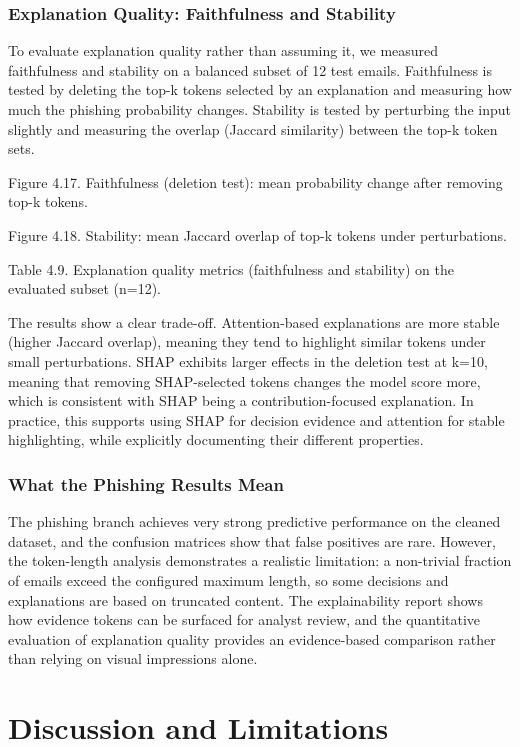 \documentclass[conference]{IEEEtran}
\begin{document}
\subsubsection{Explanation Quality: Faithfulness and Stability}

To evaluate explanation quality rather than assuming it, we measured faithfulness and stability on a balanced subset of 12 test emails. Faithfulness is tested by deleting the top-k tokens selected by an explanation and measuring how much the phishing probability changes. Stability is tested by perturbing the input slightly and measuring the overlap (Jaccard similarity) between the top-k token sets.

Figure 4.17. Faithfulness (deletion test): mean probability change after removing top-k tokens.

Figure 4.18. Stability: mean Jaccard overlap of top-k tokens under perturbations.

Table 4.9. Explanation quality metrics (faithfulness and stability) on the evaluated subset (n=12).

The results show a clear trade-off. Attention-based explanations are more stable (higher Jaccard overlap), meaning they tend to highlight similar tokens under small perturbations. SHAP exhibits larger effects in the deletion test at k=10, meaning that removing SHAP-selected tokens changes the model score more, which is consistent with SHAP being a contribution-focused explanation. In practice, this supports using SHAP for decision evidence and attention for stable highlighting, while explicitly documenting their different properties.

\subsubsection{What the Phishing Results Mean}

The phishing branch achieves very strong predictive performance on the cleaned dataset, and the confusion matrices show that false positives are rare. However, the token-length analysis demonstrates a realistic limitation: a non-trivial fraction of emails exceed the configured maximum length, so some decisions and explanations are based on truncated content. The explainability report shows how evidence tokens can be surfaced for analyst review, and the quantitative evaluation of explanation quality provides an evidence-based comparison rather than relying on visual impressions alone.

\section{Discussion and Limitations}
\end{document}
